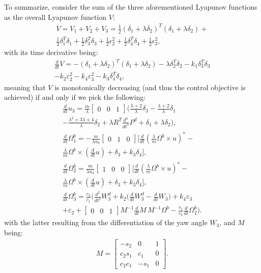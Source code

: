To summarize, consider the sum of the three aforementioned Lyapunov functions as the overall Lyapunov function $V$:
\begin{gather*}
	V=V_1+V_2+V_3=\frac{1}{2}(\delta_1+\lambda\delta_2)^T(\delta_1+\lambda\delta_2)+\\\frac{1}{2}\delta_1^T\delta_1+\frac{1}{2}\delta_3^T\delta_3+\frac{1}{2}\epsilon_2^2+\frac{1}{2}\delta_4^T\delta_4+\frac{1}{2}\epsilon_3^2,
\end{gather*}
with its time derivative being:
\begin{gather*}
	\frac{d}{dt}V=-(\delta_1+\lambda\delta_2)^T(\delta_1+\lambda\delta_2)-\lambda\delta_2^T\delta_2-k_1\delta_3^T\delta_3\\-k_2\varepsilon_2^2-k_4\varepsilon_3^2-k_3\delta_4^T\delta_4,
\end{gather*}
meaning that $V$ is monotonically decreasing (and thus the control objective is achieved) if and only if we pick the following:
\begin{gather*}
    \frac{d}{dt}u_3 =  \frac{m}{\lambda} \begin{bmatrix}
        0 & 0 & 1 \end{bmatrix} \bigg( \frac{\lambda+2}{\lambda}\delta_3-\frac{\lambda+2}{\lambda}\delta_1 \\ -\frac{\lambda^2+3\lambda+4}{\lambda}\delta_2+\lambda R^T \frac{d^3}{dt^3}P^d+ \delta_1+\lambda \delta_2 \bigg), \\
        \frac{d}{dt} \Omega^b_1 = -\frac{m}{\lambda u_3}\begin{bmatrix}0 & 1 & 0\end{bmatrix}\bigg[ \frac{d}{dt} \left( \frac{\lambda}{m} \Omega^b \times u \right)^* -\\ \frac{\lambda}{m} \Omega^b \times \left(\frac{d}{dt} u\right) + \delta_3 + k_3\delta_4 \bigg], \\
        \frac{d}{dt} \Omega^b_2 = \frac{m}{\lambda u_3}\begin{bmatrix}1 & 0 & 0\end{bmatrix}\bigg[ \frac{d}{dt} \left( \frac{\lambda}{m} \Omega^b \times u \right)^* -\\ \frac{\lambda}{m} \Omega^b \times \left(\frac{d}{dt} u\right) + \delta_3 + k_3\delta_4 \bigg], \\
        \frac{d}{dt} \Omega^b_3 = \frac{c_2}{c_1} \bigg( \frac{d^2}{dt^2} W_3^d + k_2\bigg( \frac{d}{dt} W_3^d - \frac{d}{dt} W_3 \bigg) + k_4\varepsilon_3 \\
        + \varepsilon_2 + \begin{bmatrix} 0 & 0 & 1 \end{bmatrix} M^{-1} \frac{d}{dt} M \, M^{-1} \Omega^b- \frac{s_1}{c_2} \frac{d}{dt} \Omega^b_2 \bigg).
\end{gather*}
with the latter resulting from the differentiation of the yaw angle $W_3$, and $M$ being:
\begin{align*}
    M = \begin{bmatrix}
        -s_2 & 0 & 1 \\ c_2s_1 & c_1 & 0 \\ c_2c_1 & -s_1 & 0
    \end{bmatrix}.
\end{align*}

